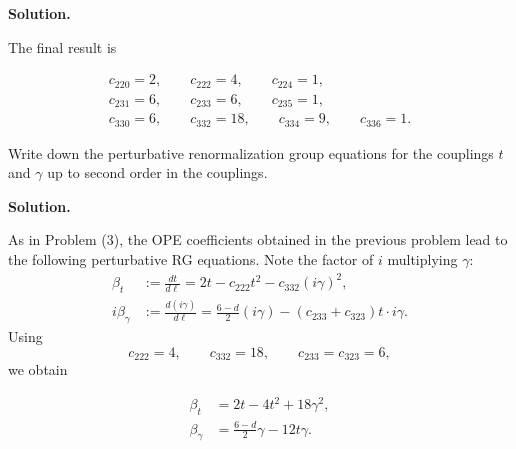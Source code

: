 \documentclass[11pt,a4paper]{article}
\newcounter{problem}
\newcounter{saveequation}
\newenvironment{solution}
{
	\par
	\setcounter{saveequation}{\value{equation}}
	\begingroup
	\setcounter{equation}{0}
	\renewcommand{\theequation}{\arabic{problem}.\arabic{equation}}
	\renewcommand{\theHequation}{sol.\arabic{problem}.\arabic{equation}}
	\noindent\textbf{Solution.}\quad
}
{
	\par
	\endgroup
	\setcounter{equation}{\value{saveequation}}
}
\begin{document}
\begin{solution}
		The final result is
		\begin{finalanswer}
			\begin{equation}
				\label{fin:7}
				\begin{gathered}
					c_{220}=2,
					\qquad
					c_{222}=4,
					\qquad
					c_{224}=1,
					\\[0.5em]
					c_{231}=6,
					\qquad
					c_{233}=6,
					\qquad
					c_{235}=1,
					\\[0.5em]
					c_{330}=6,
					\qquad
					c_{332}=18,
					\qquad
					c_{334}=9,
					\qquad
					c_{336}=1.
				\end{gathered}
			\end{equation}
		\end{finalanswer}
	\end{solution}

	\begin{problembox}
		Write down the perturbative renormalization group equations for the couplings $t$ and $\gamma$ up to second order in the couplings.
	\end{problembox}
	\begin{solution}
		As in Problem (3), the OPE coefficients obtained in the previous problem
		lead to the following perturbative RG equations. Note the factor of $i$
		multiplying $\gamma$:
		\begin{equation}
			\label{eq:8.1}
			\begin{aligned}
				\beta_t
				&:=
				\frac{dt}{d\ell}
				=
				2t-c_{222}t^2-c_{332}(i\gamma)^2,
				\\
				i\beta_\gamma
				&:=
				\frac{d(i\gamma)}{d\ell}
				=
				\frac{6-d}{2}(i\gamma)
				-\left(c_{233}+c_{323}\right)t\cdot i\gamma.
			\end{aligned}
		\end{equation}
		Using
		\[
		c_{222}=4,
		\qquad
		c_{332}=18,
		\qquad
		c_{233}=c_{323}=6,
		\]
		we obtain
		\begin{finalanswer}
			\begin{equation}
				\label{fin:8}
				\begin{aligned}
					\beta_t
					&=
					2t-4t^2+18\gamma^2,
					\\
					\beta_\gamma
					&=
					\frac{6-d}{2}\gamma-12t\gamma.
				\end{aligned}
			\end{equation}
		\end{finalanswer}
	\end{solution}
\end{document}
